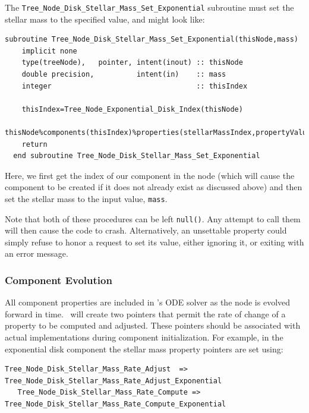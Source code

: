 The {\tt Tree\_Node\_Disk\_Stellar\_Mass\_Set\_Exponential} subroutine must set the stellar mass to the specified value, and might look like:
\begin{lstlisting}[escapechar=@,breaklines,prebreak=\&,postbreak=\&]
  subroutine Tree_Node_Disk_Stellar_Mass_Set_Exponential(thisNode,mass)
    implicit none
    type(treeNode),   pointer, intent(inout) :: thisNode
    double precision,          intent(in)    :: mass
    integer                                  :: thisIndex

    thisIndex=Tree_Node_Exponential_Disk_Index(thisNode)
    thisNode%components(thisIndex)%properties(stellarMassIndex,propertyValue)=mass
    return
  end subroutine Tree_Node_Disk_Stellar_Mass_Set_Exponential
\end{lstlisting}
Here, we first get the index of our component in the node (which will cause the component to be created if it does not already exist as discussed above) and then set the stellar mass to the input value, {\tt mass}.

Note that both of these procedures can be left {\tt null()}. Any attempt to call them will then cause the code to crash. Alternatively, an unsettable property could simply refuse to honor a request to set its value, either ignoring it, or exiting with an error message.

\subsubsection{Component Evolution}

All component properties are included in \glc's ODE solver as the node is evolved forward in time. \glc\ will create two pointers that permit the rate of change of a property to be computed and adjusted. These pointers should be associated with actual implementations during component initialization. For example, in the exponential disk component the stellar mass property pointers are set using:
\begin{lstlisting}[escapechar=@,breaklines,prebreak=\&,postbreak=\&]
   Tree_Node_Disk_Stellar_Mass_Rate_Adjust  => Tree_Node_Disk_Stellar_Mass_Rate_Adjust_Exponential
   Tree_Node_Disk_Stellar_Mass_Rate_Compute => Tree_Node_Disk_Stellar_Mass_Rate_Compute_Exponential
\end{lstlisting}

